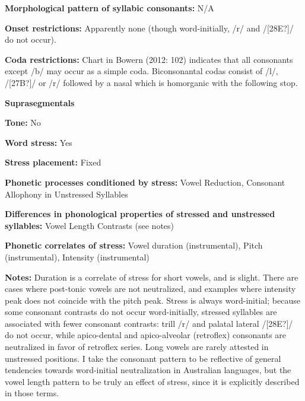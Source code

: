\begin{styleBody}
\textbf{Morphological pattern of syllabic consonants:} N/A
\end{styleBody}

\begin{styleBody}
\textbf{Onset restrictions:} Apparently none (though word-initially, /r/ and /[28E?]/ do not occur).
\end{styleBody}

\begin{styleBody}
\textbf{Coda restrictions:} Chart in Bowern (2012: 102) indicates that all consonants except /b/ may occur as a simple coda. Biconsonantal codas consist of /l/, /[27B?]/ or /r/ followed by a nasal which is homorganic with the following stop.
\end{styleBody}

\begin{styleBody}
\textbf{Suprasegmentals}
\end{styleBody}

\begin{styleBody}
\textbf{Tone:} No
\end{styleBody}

\begin{styleBody}
\textbf{Word stress:} Yes
\end{styleBody}

\begin{styleBody}
\textbf{Stress placement:} Fixed
\end{styleBody}

\begin{styleBody}
\textbf{Phonetic processes conditioned by stress:} Vowel Reduction, Consonant Allophony in Unstressed Syllables
\end{styleBody}

\begin{styleBody}
\textbf{Differences in phonological properties of stressed and unstressed syllables:} Vowel Length Contrasts (see notes)
\end{styleBody}

\begin{styleBody}
\textbf{Phonetic correlates of stress: }Vowel duration (instrumental), Pitch (instrumental), Intensity (instrumental)
\end{styleBody}

\begin{styleBody}
\textbf{Notes: }Duration is a correlate of stress for short vowels, and is slight. There are cases where post-tonic vowels are not neutralized, and examples where intensity peak does not coincide with the pitch peak. Stress is always word-initial; because some consonant contrasts do not occur word-initially, stressed syllables are associated with fewer consonant contrasts: trill /r/ and palatal lateral /[28E?]/ do not occur, while apico-dental and apico-alveolar (retroflex) consonants are neutralized in favor of retroflex series. Long vowels are rarely attested in unstressed positions. I take the consonant pattern to be reflective of general tendencies towards word-initial neutralization in Australian languages, but the vowel length pattern to be truly an effect of stress, since it is explicitly described in those terms.
\end{styleBody}

